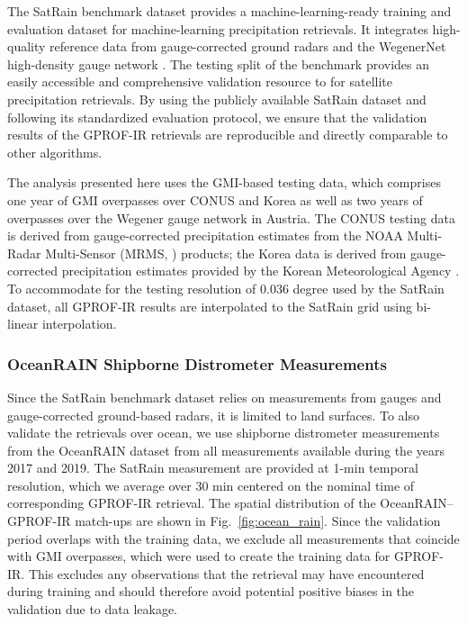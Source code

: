 \documentclass{ametsocV6.1}
\begin{document}
The SatRain benchmark dataset \citep{pfreundschuh2026benchmark} provides a
machine-learning-ready training and evaluation dataset for machine-learning
precipitation retrievals. It integrates high-quality reference data from
gauge-corrected ground radars and the WegenerNet high-density gauge network
\citep{fuchsberger_wegenernet_2021}. The testing split of the benchmark provides
an easily accessible and comprehensive validation resource to for satellite
precipitation retrievals. By using the publicly available SatRain dataset
and following its standardized evaluation protocol, we ensure that the
validation results of the GPROF-IR retrievals are reproducible and directly
comparable to other algorithms.

The analysis presented here uses the GMI-based testing data, which comprises one
year of GMI overpasses over CONUS and Korea as well as two years of overpasses
over the Wegener gauge network in Austria. The CONUS testing data is derived
from gauge-corrected precipitation estimates from the NOAA Multi-Radar
Multi-Sensor (MRMS, \citep{smith_multi-radar_2016}) products; the Korea data is
derived from gauge-corrected precipitation estimates provided by the Korean
Meteorological Agency \citep{ryu_radar_2025}. To accommodate for the testing
resolution of 0.036 degree used by the SatRain dataset, all GPROF-IR results are
interpolated to the SatRain grid using bi-linear interpolation.


\subsubsection{OceanRAIN Shipborne Distrometer Measurements}

Since the SatRain benchmark dataset relies on measurements from gauges and
gauge-corrected ground-based radars, it is limited to land surfaces. To also
validate the retrievals over ocean, we use shipborne distrometer measurements
from the OceanRAIN dataset \citep{klepp2018oceanrain} from all measurements
available during the years 2017 and 2019. The SatRain measurement are provided
at 1-min temporal resolution, which we average over 30 min centered on the
nominal time of corresponding GPROF-IR retrieval. The spatial distribution of
the OceanRAIN--GPROF-IR match-ups are shown in Fig.~\ref{fig:ocean_rain}. Since
the validation period overlaps with the training data, we exclude all
measurements that coincide with GMI overpasses, which were used to create the
training data for GPROF-IR. This excludes any observations that the retrieval
may have encountered during training and should therefore avoid potential
positive biases in the validation due to data leakage.
\end{document}

